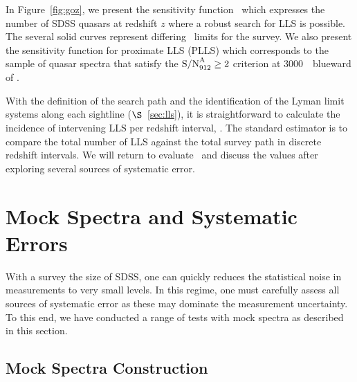 \documentclass[12pt,preprint]{aastex}
\begin{document}
In Figure~\ref{fig:goz}, we present the sensitivity function
\gz\ which expresses the number of SDSS quasars at redshift $z$
where a robust search for LLS is possible.
The several solid curves represent differing \sna\ limits for the survey.
We also present the sensitivity function for proximate LLS (PLLS)
which corresponds to the sample of quasar spectra that satisfy
the ${\rm S/N}^{\rm A}_{912} \ge 2$ criterion at 3000~\kms\ blueward of \zem.

With the definition of the search path 
and the identification of the Lyman limit systems along each
sightline ($\S$~\ref{sec:lls}),
it is straightforward to calculate the incidence of intervening
LLS per redshift interval, \lzlls.  
The standard estimator is to compare the total number of LLS
against the total survey path in discrete redshift intervals.
We will return to evaluate \lzlls\ and discuss the values
after exploring several sources of systematic error.


\section{Mock Spectra and Systematic Errors}
\label{appx:mock}

With a survey the size of SDSS, one can quickly reduces the statistical
noise in measurements to very small levels.  In this
regime, one must carefully assess all sources of systematic
error as these may dominate the measurement uncertainty.
To this end, we have conducted a range of tests with mock
spectra as described in this section.

\subsection{Mock Spectra Construction}
\end{document}
